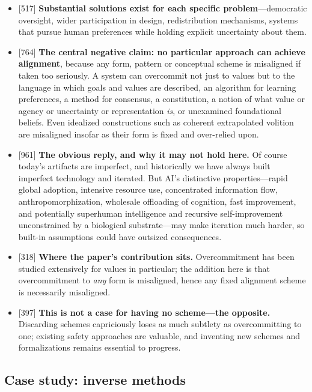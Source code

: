 \documentclass[11pt]{article}
\newcommand{\ct}[1]{{\footnotesize\color{black!55}[#1]}\hspace{1pt}}
\begin{document}
\begin{itemize}
  \item \ct{517} \textbf{Substantial solutions exist for each specific problem}---democratic oversight, wider participation in design, redistribution mechanisms, systems that pursue human preferences while holding explicit uncertainty about them.
  \item \ct{764} \textbf{The central negative claim: no particular approach can achieve alignment}, because any form, pattern or conceptual scheme is misaligned if taken too seriously. A system can overcommit not just to values but to the language in which goals and values are described, an algorithm for learning preferences, a method for consensus, a constitution, a notion of what value or agency or uncertainty or representation \emph{is}, or unexamined foundational beliefs. Even idealized constructions such as coherent extrapolated volition are misaligned insofar as their form is fixed and over-relied upon.
  \item \ct{961} \textbf{The obvious reply, and why it may not hold here.} Of course today's artifacts are imperfect, and historically we have always built imperfect technology and iterated. But AI's distinctive properties---rapid global adoption, intensive resource use, concentrated information flow, anthropomorphization, wholesale offloading of cognition, fast improvement, and potentially superhuman intelligence and recursive self-improvement unconstrained by a biological substrate---may make iteration much harder, so built-in assumptions could have outsized consequences.
  \item \ct{318} \textbf{Where the paper's contribution sits.} Overcommitment has been studied extensively for values in particular; the addition here is that overcommitment to \emph{any} form is misaligned, hence any fixed alignment scheme is necessarily misaligned.
  \item \ct{397} \textbf{This is not a case for having no scheme---the opposite.} Discarding schemes capriciously loses as much subtlety as overcommitting to one; existing safety approaches are valuable, and inventing new schemes and formalizations remains essential to progress.
\end{itemize}

\subsection{Case study: inverse methods}
\end{document}
